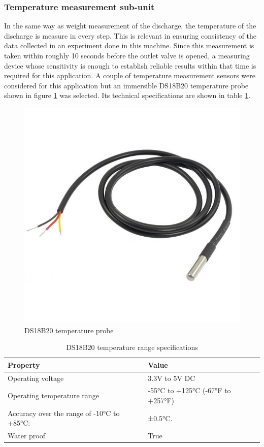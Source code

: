 \subsubsection{Temperature measurement sub-unit}
In the same way as weight measurement of the discharge, the temperature of the discharge is measure in every step. This is relevant in ensuring consistency of the data collected in an experiment done in this machine. Since this measurement is taken within roughly 10 seconds before the outlet valve is opened, a measuring device whose sensitivity is enough to establish reliable results within that time is required for this application. A couple of temperature measurement sensors were considered for this application but an immersible DS18B20 temperature probe shown in figure \ref{fig:ds18b20_temperature} was selected. Its technical specifications are shown in table \ref{tab:ds18b20 temperature probe}.
\begin{figure}[H]
    \centering
    \includegraphics[width=.28\textwidth, height=.28\textheight]{Figures/ds18b20_temperature_probe.jpg}
    \caption[DS18B20 temperature probe]{DS18B20 temperature probe \cite{ds18b20}}
    \label{fig:ds18b20_temperature}
\end{figure}
\begin{table}[H]
\centering
\caption[DS18B20 temperature range specifications]{DS18B20 temperature range specifications \cite{ds18b20}}
\begin{tabular}{|l|l|}
\hline
\textbf{Property} & \textbf{Value} \\ \hline
Operating voltage & 3.3V  to 5V DC \\ \hline
Operating temperature range & -55°C to +125°C (-67°F to +257°F) \\ \hline
Accuracy over the range of -10°C to +85°C: & ±0.5°C. \\ \hline
Water proof & True \\ \hline
\end{tabular}
\label{tab:ds18b20 temperature probe}
\end{table}

